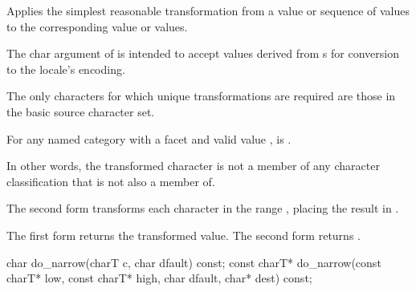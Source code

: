 \begin{itemdescr}
\pnum
\effects
Applies the simplest reasonable transformation
from a  value or sequence of  values
to the corresponding  value or values.
\begin{footnote}
The char argument of  is intended to
accept values derived from s
for conversion to the locale's encoding.
\end{footnote}
The only characters for which unique transformations are required
are those in the basic source character set.

For any named  category with
a  facet  and
valid  value ,
 is .
\begin{footnote}
In other words, the transformed character is not
a member of any character classification
that  is not also a member of.
\end{footnote}

The second form transforms
each character  in the range ,
placing the result in .

\pnum
\returns
The first form returns the transformed value.
The second form returns .
\end{itemdescr}

%
\begin{itemdecl}
char         do_narrow(charT c, char dfault) const;
const charT* do_narrow(const charT* low, const charT* high, char dfault, char* dest) const;
\end{itemdecl}

